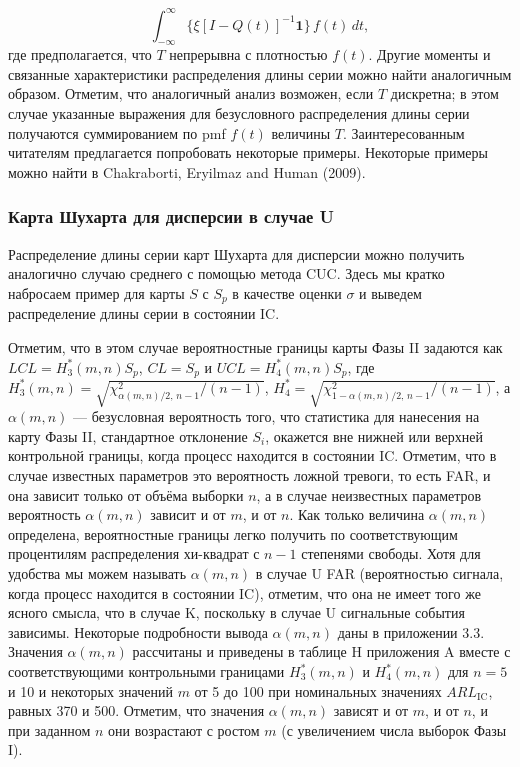 \begin{equation}
	\int_{-\infty}^{\infty} \{\xi [I - Q(t)]^{-1}\mathbf{1}\}\, f(t)\,dt,
	\label{eq:3.40}
\end{equation}
где предполагается, что \(T\) непрерывна с плотностью \(f(t)\). Другие моменты и связанные характеристики распределения длины серии можно найти аналогичным образом. Отметим, что аналогичный анализ возможен, если \(T\) дискретна; в этом случае указанные выражения для безусловного распределения длины серии получаются суммированием по pmf \(f(t)\) величины \(T\). Заинтересованным читателям предлагается попробовать некоторые примеры. Некоторые примеры можно найти в Chakraborti, Eryilmaz and Human (2009).
\subsubsection{Карта Шухарта для дисперсии в случае U}

Распределение длины серии карт Шухарта для дисперсии можно получить аналогично случаю среднего с помощью метода CUC. Здесь мы кратко набросаем пример для карты \(S\) с \(S_p\) в качестве оценки \(\sigma\) и выведем распределение длины серии в состоянии IC.

Отметим, что в этом случае вероятностные границы карты Фазы II задаются как \(LCL = H_3^*(m,n)S_p\), \(CL = S_p\) и \(UCL = H_4^*(m,n)S_p\), где \(H_3^*(m,n) = \sqrt{\chi^2_{\alpha(m,n)/2,\,n-1}/(n - 1)}\), \(H_4^* = \sqrt{\chi^2_{1-\alpha(m,n)/2,\,n-1}/(n - 1)}\), а \(\alpha(m,n)\) — безусловная вероятность того, что статистика для нанесения на карту Фазы II, стандартное отклонение \(S_i\), окажется вне нижней или верхней контрольной границы, когда процесс находится в состоянии IC. Отметим, что в случае известных параметров это вероятность ложной тревоги, то есть FAR, и она зависит только от объёма выборки \(n\), а в случае неизвестных параметров вероятность \(\alpha(m,n)\) зависит и от \(m\), и от \(n\). Как только величина \(\alpha(m,n)\) определена, вероятностные границы легко получить по соответствующим процентилям распределения хи-квадрат с \(n - 1\) степенями свободы. Хотя для удобства мы можем называть \(\alpha(m,n)\) в случае U FAR (вероятностью сигнала, когда процесс находится в состоянии IC), отметим, что она не имеет того же ясного смысла, что в случае K, поскольку в случае U сигнальные события зависимы. Некоторые подробности вывода \(\alpha(m,n)\) даны в приложении 3.3. Значения \(\alpha(m,n)\) рассчитаны и приведены в таблице H приложения A вместе с соответствующими контрольными границами \(H_3^*(m,n)\) и \(H_4^*(m,n)\) для \(n = 5\) и 10 и некоторых значений \(m\) от 5 до 100 при номинальных значениях \(ARL_{\text{IC}}\), равных 370 и 500. Отметим, что значения \(\alpha(m,n)\) зависят и от \(m\), и от \(n\), и при заданном \(n\) они возрастают с ростом \(m\) (с увеличением числа выборок Фазы I).

